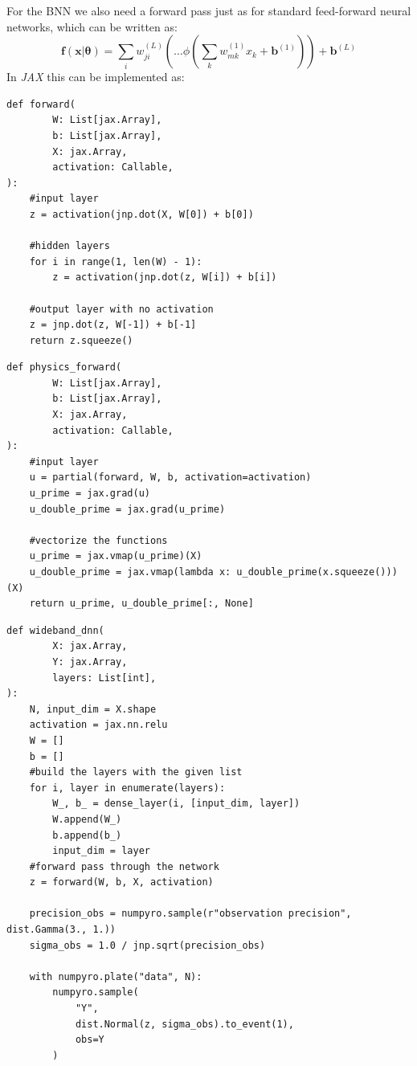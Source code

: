 \documentclass{article}
\begin{document}
For the BNN we also need a forward pass just as for standard feed-forward neural networks, which can be written as:
\begin{equation}
    \bm f(\bm x|\bm \theta) = \sum_i w^{(L)}_{ji} \left( \ldots \phi \left( \sum_k w^{(1)}_{mk}x_k + \bm b^{(1)} \right) \right) + \bm b^{(L)}
\end{equation}
In \textit{JAX} this can be implemented as:
\begin{lstlisting}[caption= {Feed forward Neural Network},captionpos=t]
def forward(
        W: List[jax.Array],
        b: List[jax.Array],
        X: jax.Array,
        activation: Callable,
):
    #input layer
    z = activation(jnp.dot(X, W[0]) + b[0])

    #hidden layers
    for i in range(1, len(W) - 1):
        z = activation(jnp.dot(z, W[i]) + b[i])

    #output layer with no activation
    z = jnp.dot(z, W[-1]) + b[-1]
    return z.squeeze()
\end{lstlisting} 
\begin{lstlisting}[caption= {Physics Informed Neural Net},captionpos=t]
def physics_forward(
        W: List[jax.Array],
        b: List[jax.Array],
        X: jax.Array,
        activation: Callable,
):
    #input layer
    u = partial(forward, W, b, activation=activation)
    u_prime = jax.grad(u)
    u_double_prime = jax.grad(u_prime)

    #vectorize the functions
    u_prime = jax.vmap(u_prime)(X)
    u_double_prime = jax.vmap(lambda x: u_double_prime(x.squeeze()))(X)
    return u_prime, u_double_prime[:, None]
\end{lstlisting}
\begin{lstlisting}
def wideband_dnn(
        X: jax.Array,
        Y: jax.Array,
        layers: List[int],
):
    N, input_dim = X.shape
    activation = jax.nn.relu
    W = []
    b = []
    #build the layers with the given list
    for i, layer in enumerate(layers):
        W_, b_ = dense_layer(i, [input_dim, layer])
        W.append(W_)
        b.append(b_)
        input_dim = layer
    #forward pass through the network
    z = forward(W, b, X, activation)
    
    precision_obs = numpyro.sample(r"observation precision", dist.Gamma(3., 1.))
    sigma_obs = 1.0 / jnp.sqrt(precision_obs)

    with numpyro.plate("data", N):
        numpyro.sample(
            "Y", 
            dist.Normal(z, sigma_obs).to_event(1), 
            obs=Y
        )
\end{lstlisting}
\end{document}
